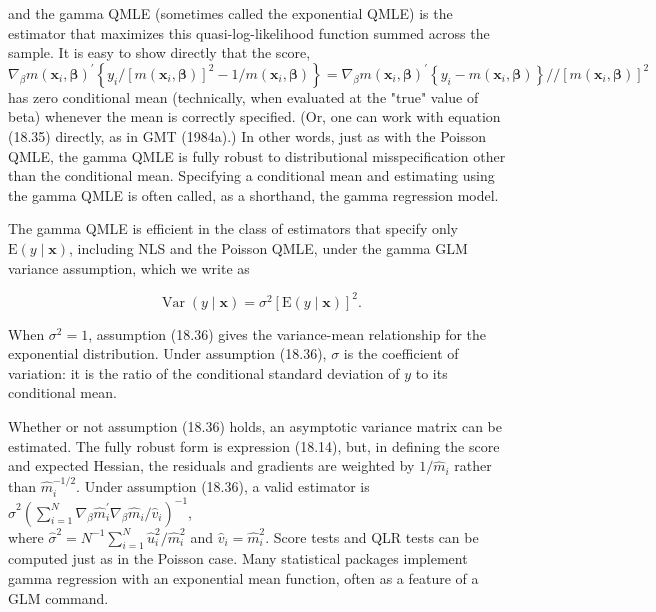 \documentclass[10pt]{article}
\begin{document}
and the gamma QMLE (sometimes called the exponential QMLE) is the estimator that maximizes this quasi-log-likelihood function summed across the sample. It is easy to show directly that the score, $\nabla_{\beta} m\left(\mathbf{x}_{i}, \boldsymbol{\beta}\right)^{\prime}\left\{y_{i} /\left[m\left(\mathbf{x}_{i}, \boldsymbol{\beta}\right)\right]^{2}-1 / m\left(\mathbf{x}_{i}, \boldsymbol{\beta}\right)\right\}= \nabla_{\beta} m\left(\mathbf{x}_{i}, \boldsymbol{\beta}\right)^{\prime}\left\{y_{i}-m\left(\mathbf{x}_{i}, \boldsymbol{\beta}\right)\right\} / /\left[m\left(\mathbf{x}_{i}, \boldsymbol{\beta}\right)\right]^{2}$ has zero conditional mean (technically, when evaluated at the "true" value of beta) whenever the mean is correctly specified. (Or, one can work with equation (18.35) directly, as in GMT (1984a).) In other words, just as with the Poisson QMLE, the gamma QMLE is fully robust to distributional misspecification other than the conditional mean. Specifying a conditional mean and estimating using the gamma QMLE is often called, as a shorthand, the gamma regression model.

The gamma QMLE is efficient in the class of estimators that specify only $\mathrm{E}(y \mid \mathbf{x})$, including NLS and the Poisson QMLE, under the gamma GLM variance assumption, which we write as


\begin{equation*}
\operatorname{Var}(y \mid \mathbf{x})=\sigma^{2}[\mathrm{E}(y \mid \mathbf{x})]^{2} . \tag{18.36}
\end{equation*}


When $\sigma^{2}=1$, assumption (18.36) gives the variance-mean relationship for the exponential distribution. Under assumption (18.36), $\sigma$ is the coefficient of variation: it is the ratio of the conditional standard deviation of $y$ to its conditional mean.

Whether or not assumption (18.36) holds, an asymptotic variance matrix can be estimated. The fully robust form is expression (18.14), but, in defining the score and expected Hessian, the residuals and gradients are weighted by $1 / \hat{m}_{i}$ rather than $\hat{m}_{i}^{-1 / 2}$. Under assumption (18.36), a valid estimator is\\
$\hat{\sigma}^{2}\left(\sum_{i=1}^{N} \nabla_{\beta} \hat{m}_{i}^{\prime} \nabla_{\beta} \hat{m}_{i} / \hat{v}_{i}\right)^{-1}$,\\
where $\hat{\sigma}^{2}=N^{-1} \sum_{i=1}^{N} \hat{u}_{i}^{2} / \hat{m}_{i}^{2}$ and $\hat{v}_{i}=\hat{m}_{i}^{2}$. Score tests and QLR tests can be computed just as in the Poisson case. Many statistical packages implement gamma regression with an exponential mean function, often as a feature of a GLM command.
\end{document}
